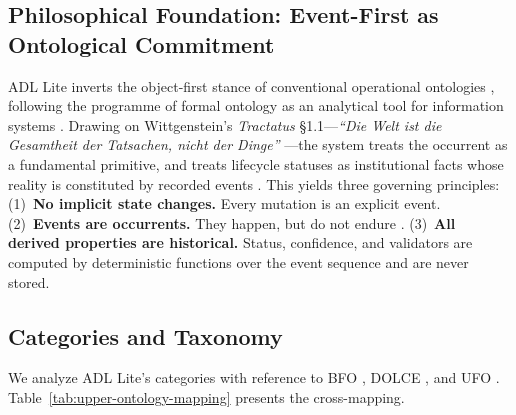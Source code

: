 \subsection{Philosophical Foundation: Event-First as Ontological Commitment}\label{subsec:philosophical-foundation}

ADL Lite inverts the object-first stance of conventional operational ontologies \cite{palantir_fde,dendron2020}, following the programme of formal ontology as an analytical tool for information systems \cite{guarino_1998}. Drawing on Wittgenstein's \emph{Tractatus} \S1.1---\emph{``Die Welt ist die Gesamtheit der Tatsachen, nicht der Dinge''} \cite{wittgenstein_tractatus,event_sourcing}---the system treats the occurrent as a fundamental primitive, and treats lifecycle statuses as institutional facts whose reality is constituted by recorded events \cite{searle1995construction}. This yields three governing principles: (1)~\textbf{No implicit state changes.} Every mutation is an explicit event. (2)~\textbf{Events are occurrents.} They happen, but do not endure \cite{bfo,dolce}. (3)~\textbf{All derived properties are historical.} Status, confidence, and validators are computed by deterministic functions over the event sequence and are never stored.

\subsection{Categories and Taxonomy}\label{subsec:categories}

We analyze ADL Lite's categories with reference to BFO \cite{bfo}, DOLCE \cite{dolce}, and UFO \cite{ufo}. Table~\ref{tab:upper-ontology-mapping} presents the cross-mapping.

